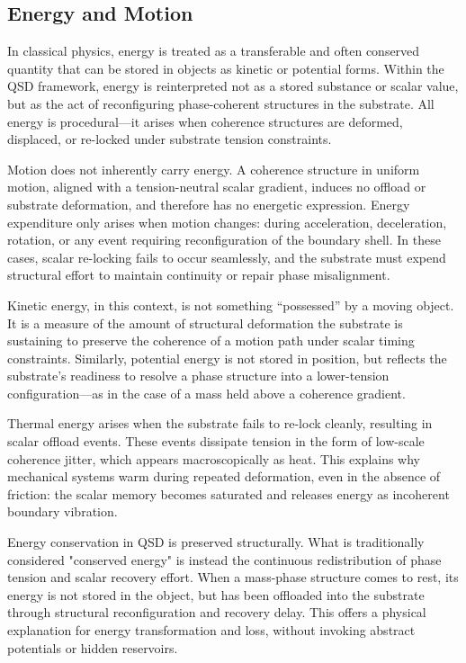 \documentclass[entropy,article,submit,pdftex,moreauthors]{Definitions/mdpi}
\begin{document}
\subsection{Energy and Motion}

In classical physics, energy is treated as a transferable and often conserved quantity that can be stored in objects as kinetic or potential forms. Within the QSD framework, energy is reinterpreted not as a stored substance or scalar value, but as the act of reconfiguring phase-coherent structures in the substrate. All energy is procedural---it arises when coherence structures are deformed, displaced, or re-locked under substrate tension constraints.

Motion does not inherently carry energy. A coherence structure in uniform motion, aligned with a tension-neutral scalar gradient, induces no offload or substrate deformation, and therefore has no energetic expression. Energy expenditure only arises when motion changes: during acceleration, deceleration, rotation, or any event requiring reconfiguration of the boundary shell. In these cases, scalar re-locking fails to occur seamlessly, and the substrate must expend structural effort to maintain continuity or repair phase misalignment.

Kinetic energy, in this context, is not something “possessed” by a moving object. It is a measure of the amount of structural deformation the substrate is sustaining to preserve the coherence of a motion path under scalar timing constraints. Similarly, potential energy is not stored in position, but reflects the substrate's readiness to resolve a phase structure into a lower-tension configuration---as in the case of a mass held above a coherence gradient.

Thermal energy arises when the substrate fails to re-lock cleanly, resulting in scalar offload events. These events dissipate tension in the form of low-scale coherence jitter, which appears macroscopically as heat. This explains why mechanical systems warm during repeated deformation, even in the absence of friction: the scalar memory becomes saturated and releases energy as incoherent boundary vibration.

Energy conservation in QSD is preserved structurally. What is traditionally considered "conserved energy" is instead the continuous redistribution of phase tension and scalar recovery effort. When a mass-phase structure comes to rest, its energy is not stored in the object, but has been offloaded into the substrate through structural reconfiguration and recovery delay. This offers a physical explanation for energy transformation and loss, without invoking abstract potentials or hidden reservoirs.
\end{document}
